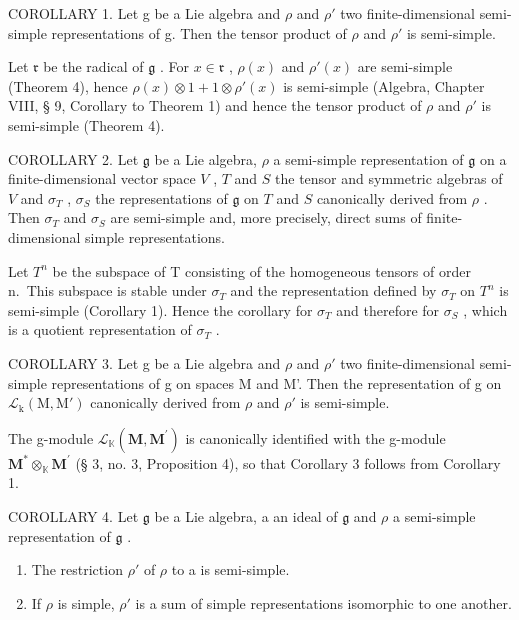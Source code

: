 COROLLARY 1. Let g be a Lie algebra and \(\rho\) and \(\rho'\) two finite-dimensional semi-simple representations of g. Then the tensor product of \(\rho\) and \(\rho'\) is semi-simple.

Let \(\mathfrak{r}\) be the radical of \(\mathfrak{g}\) . For \(x \in \mathfrak{r}\) , \(\rho(x)\) and \(\rho'(x)\) are semi-simple (Theorem 4), hence \(\rho(x) \otimes 1 + 1 \otimes \rho'(x)\) is semi-simple (Algebra, Chapter VIII, § 9, Corollary to Theorem 1) and hence the tensor product of \(\rho\) and \(\rho'\) is semi-simple (Theorem 4).

COROLLARY 2. Let \(\mathfrak{g}\) be a Lie algebra, \(\rho\) a semi-simple representation of \(\mathfrak{g}\) on a finite-dimensional vector space \(V\) , \(T\) and \(S\) the tensor and symmetric algebras of \(V\) and \(\sigma_{T}\) , \(\sigma_{S}\) the representations of \(\mathfrak{g}\) on \(T\) and \(S\) canonically derived from \(\rho\) . Then \(\sigma_{T}\) and \(\sigma_{S}\) are semi-simple and, more precisely, direct sums of finite-dimensional simple representations.

Let \(T^{n}\) be the subspace of T consisting of the homogeneous tensors of order n.~This subspace is stable under \(\sigma_{T}\) and the representation defined by \(\sigma_{T}\) on \(T^{n}\) is semi-simple (Corollary 1). Hence the corollary for \(\sigma_{T}\) and therefore for \(\sigma_{S}\) , which is a quotient representation of \(\sigma_{T}\) .

COROLLARY 3. Let g be a Lie algebra and \(\rho\) and \(\rho'\) two finite-dimensional semi-simple representations of g on spaces M and M'. Then the representation of g on \(\mathcal{L}_{\mathrm{k}}(\mathrm{M},\mathrm{M}')\) canonically derived from \(\rho\) and \(\rho'\) is semi-simple.

The g-module \(\mathcal{L}_{\mathbb{K}}(\mathbf{M},\mathbf{M}^{\prime})\) is canonically identified with the g-module \(\mathbf{M}^{*}\otimes_{\mathbb{K}}\mathbf{M}^{\prime}\) (§ 3, no. 3, Proposition 4), so that Corollary 3 follows from Corollary 1.

COROLLARY 4. Let \(\mathfrak{g}\) be a Lie algebra, a an ideal of \(\mathfrak{g}\) and \(\rho\) a semi-simple representation of \(\mathfrak{g}\) .

\begin{enumerate}
\def\labelenumi{(\alph{enumi})}
\item
  The restriction \(\rho'\) of \(\rho\) to a is semi-simple.
\item
  If \(\rho\) is simple, \(\rho'\) is a sum of simple representations isomorphic to one another.
\end{enumerate}

